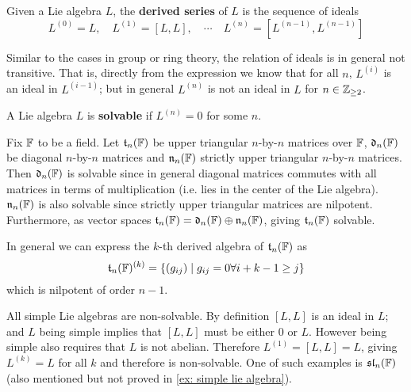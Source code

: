 \documentclass{article}
\begin{document}
\begin{definition}\label{def: derived series}
    Given a Lie algebra $L$, the \textbf{derived series} of $L$ is the sequence of ideals
    \[
        L^{(0)} = L, \quad L^{(1)} = [L, L], \quad \cdots \quad L^{(n)} = [L^{(n-1)}, L^{(n-1)}]
    \]
\end{definition}
\nogap
\begin{remark}
    Similar to the cases in group or ring theory, the relation of ideals is in general not transitive. That is, directly from the expression we know that for all $n$, $L^{(i)}$ is an ideal in $L^{(i-1)}$; but in general $L^{(n)}$ is not an ideal in $L$ for $n \in \mathbb{Z}_{\geq 2}$.
\end{remark}
\nogap
\begin{definition}[Solvable]
    A Lie algebra $L$ is \textbf{solvable} if $L^{(n)} = 0$ for some $n$.
\end{definition}

\begin{example}\label{ex: derived series}
    Fix $\mathbb{F}$ to be a field. Let $\mathfrak{t}_n(\mathbb{F})$ be upper triangular $n$-by-$n$ matrices over $\mathbb{F}$, $\mathfrak{d}_n(\mathbb{F})$ be diagonal $n$-by-$n$ matrices and $\mathfrak{n}_n(\mathbb{F})$ strictly upper triangular $n$-by-$n$ matrices. Then $\mathfrak{d}_n(\mathbb{F})$ is solvable since in general diagonal matrices commutes with all matrices in terms of multiplication (i.e. lies in the center of the Lie algebra). $\mathfrak{n}_n(\mathbb{F})$ is also solvable since strictly upper triangular matrices are nilpotent. Furthermore, as vector spaces $\mathfrak{t}_n(\mathbb{F}) = \mathfrak{d}_n(\mathbb{F}) \oplus \mathfrak{n}_n(\mathbb{F})$, giving $\mathfrak{t}_n(\mathbb{F})$ solvable.

    In general we can express the $k$-th derived algebra of $\mathfrak{t}_n(\mathbb{F})$ as
    \[
        \mathfrak{t}_n(\mathbb{F})^{(k)} = \{ (g_{ij}) \mid g_{ij} = 0 \forall i + k - 1 \geq j \}
    \]
    which is nilpotent of order $n-1$.
\end{example}
\nogap
\begin{example}
    All simple Lie algebras are non-solvable. By definition $[L, L]$ is an ideal in $L$; and $L$ being simple implies that $[L, L]$ must be either 0 or $L$. However being simple also requires that $L$ is not abelian. Therefore $L^{(1)} = [L, L] = L$, giving $L^{(k)} = L$ for all $k$ and therefore is non-solvable. One of such examples is $\mathfrak{sl}_n(\mathbb{F})$ (also mentioned but not proved in \ref{ex: simple lie algebra}).
\end{example}
\end{document}
